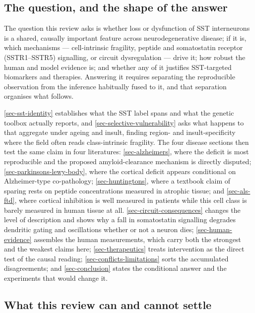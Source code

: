 \documentclass[11pt]{article}
\begin{document}
\subsection{The question, and the shape of the answer}
\label{sec-01-question}

The question this review asks is whether loss or dysfunction of SST interneurons is a shared, causally important feature across neurodegenerative disease; if it is, which mechanisms --- cell-intrinsic fragility, peptide and somatostatin receptor (SSTR1--SSTR5) signalling, or circuit dysregulation --- drive it; how robust the human and model evidence is; and whether any of it justifies SST-targeted biomarkers and therapies. Answering it requires separating the reproducible observation from the inference habitually fused to it, and that separation organises what follows.

\ref{sec-sst-identity} establishes what the SST label spans and what the genetic toolbox actually reports, and \ref{sec-selective-vulnerability} asks what happens to that aggregate under ageing and insult, finding region- and insult-specificity where the field often reads class-intrinsic fragility. The four disease sections then test the same claim in four literatures: \ref{sec-alzheimers}, where the deficit is most reproducible and the proposed amyloid-clearance mechanism is directly disputed; \ref{sec-parkinsons-lewy-body}, where the cortical deficit appears conditional on Alzheimer-type co-pathology; \ref{sec-huntingtons}, where a textbook claim of sparing rests on peptide concentrations measured in atrophic tissue; and \ref{sec-als-ftd}, where cortical inhibition is well measured in patients while this cell class is barely measured in human tissue at all. \ref{sec-circuit-consequences} changes the level of description and shows why a fall in somatostatin signalling degrades dendritic gating and oscillations whether or not a neuron dies; \ref{sec-human-evidence} assembles the human measurements, which carry both the strongest and the weakest claims here; \ref{sec-therapeutics} treats intervention as the direct test of the causal reading; \ref{sec-conflicts-limitations} sorts the accumulated disagreements; and \ref{sec-conclusion} states the conditional answer and the experiments that would change it.

\subsection{What this review can and cannot settle}
\label{sec-01-evidence-base}
\end{document}
